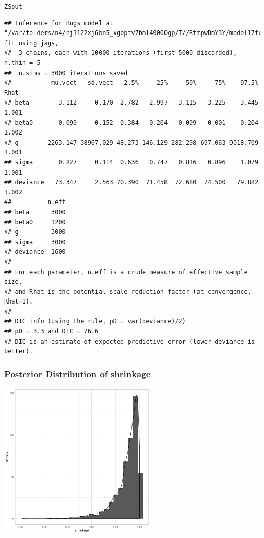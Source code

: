 \documentclass[]{beamer}\usepackage[]{graphicx}\usepackage[]{color}
\makeatletter
\newcommand{\hlstd}[1]{\textcolor[rgb]{0.345,0.345,0.345}{#1}}%
\newenvironment{kframe}{%
 \def\at@end@of@kframe{}%
 \ifinner\ifhmode%
  \def\at@end@of@kframe{\end{minipage}}%
  \begin{minipage}{\columnwidth}%
 \fi\fi%
 \def\FrameCommand##1{\hskip\@totalleftmargin \hskip-\fboxsep
 \colorbox{shadecolor}{##1}\hskip-\fboxsep
     \hskip-\linewidth \hskip-\@totalleftmargin \hskip\columnwidth}%
 \MakeFramed {\advance\hsize-\width
   \@totalleftmargin\z@ \linewidth\hsize
   \@setminipage}}%
 {\par\unskip\endMakeFramed%
 \at@end@of@kframe}
\newenvironment{knitrout}{}{} %
\makeatother
\begin{document}
\begin{frame}[fragile]
\begin{tiny}
\begin{knitrout}
\color{fgcolor}\begin{kframe}
\begin{alltt}
\hlstd{ZSout}
\end{alltt}
\begin{verbatim}
## Inference for Bugs model at "/var/folders/n4/nj1122xj6bn5_xgbptv7bml40000gp/T//RtmpwDmY3Y/model17fcc74341fa7.txt", fit using jags,
##  3 chains, each with 10000 iterations (first 5000 discarded), n.thin = 5
##  n.sims = 3000 iterations saved
##           mu.vect   sd.vect   2.5%     25%     50%     75%    97.5%  Rhat
## beta        3.112     0.170  2.782   2.997   3.115   3.225    3.445 1.001
## beta0      -0.099     0.152 -0.384  -0.204  -0.099   0.001    0.204 1.002
## g        2263.147 38967.029 48.273 146.129 282.298 697.063 9018.709 1.001
## sigma       0.827     0.114  0.636   0.747   0.816   0.896    1.079 1.001
## deviance   73.347     2.563 70.390  71.458  72.680  74.500   79.882 1.002
##          n.eff
## beta      3000
## beta0     1200
## g         3000
## sigma     3000
## deviance  1600
## 
## For each parameter, n.eff is a crude measure of effective sample size,
## and Rhat is the potential scale reduction factor (at convergence, Rhat=1).
## 
## DIC info (using the rule, pD = var(deviance)/2)
## pD = 3.3 and DIC = 76.6
## DIC is an estimate of expected predictive error (lower deviance is better).
\end{verbatim}
\end{kframe}
\end{knitrout}
\end{tiny}
\end{frame}

\begin{frame}[fragile]\frametitle{Posterior Distribution of shrinkage}

\begin{knitrout}
\color{fgcolor}
\includegraphics[width=3in,height=3in]{figure/marginal-1} 

\end{knitrout}


\end{frame}
\end{document}
